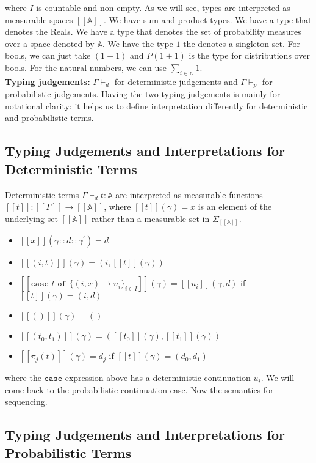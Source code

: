 \documentclass[11pt]{article}
\theoremstyle{definition}
\theoremstyle{plain}
\renewcommand{\b}[1]{\mathbb{#1}}
\begin{document}
\noindent where $I$ is countable and non-empty. As we will see, 
types are interpreted as measurable spaces $[[\b{A}]]$. We have sum and product types.
We have a type that denotes the Reals. We have a type that denotes 
the set of probability measures over a space denoted by $\b{A}$. 
We have the type $1$ the denotes a singleton set. For bools, we can just take
$(1+1)$ and $P(1+1)$ is the type for distributions over bools.
For the natural numbers, we can use $\sum_{i \in \b{N}} 1$. \\

\noindent \textbf{Typing judgements:} $\Gamma \vdash_d$ for deterministic
judgements and $\Gamma \vdash_p$ for probabilistic judgements. Having the two
typing judgements is mainly for notational clarity: it helps us to define 
interpretation differently for deterministic and probabilistic terms. \\


\subsection{Typing Judgements and Interpretations for Deterministic Terms}

\noindent Deterministic terms 
$\Gamma \vdash_d t : \b{A}$ are interpreted
as measurable functions $[[t]]: [[\Gamma]] \rightarrow [[\b{A}]]$,
where $[[t]](\gamma) = x$ is an element of the underlying set
$[[\b{A}]]$ rather than a measurable set in $\Sigma_{[[\b{A}]]}$.

\begin{itemize}
  \item $[[x]](\gamma::d::\gamma^\prime) = d$
  \item $[[(i,t)]](\gamma) = (i,[[t]](\gamma))$
  \item $[[\texttt{case } t \texttt{ of } \{(i,x) 
         \rightarrow u_i\}_{i \in I}]](\gamma) = 
         [[u_i]](\gamma,d)$ if $[[t]](\gamma) = (i,d)$
  \item $[[()]](\gamma) = ()$
  \item $[[(t_0,t_1)]](\gamma) = ([[t_0]](\gamma),[[t_1]](\gamma))$
  \item $[[\pi_j(t)]](\gamma) = d_j$ if $[[t]](\gamma) = (d_0,d_1)$
\end{itemize}

\noindent where the $\texttt{case}$ expression above has a
deterministic continuation $u_i$. We will come back to the 
probabilistic continuation case. Now the semantics for sequencing.


\subsection{Typing Judgements and Interpretations for Probabilistic Terms}
\end{document}
